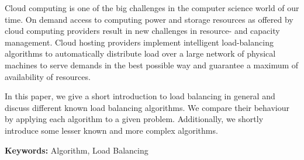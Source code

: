 Cloud computing is one of the big challenges in the computer science world of
our time.
On demand access to computing power and storage resources
as offered by cloud computing providers result in new challenges in resource-
and capacity management.
Cloud hosting providers implement intelligent load-balancing algorithms to
automatically
distribute load over a large network of physical machines to serve demands in
the best possible way and guarantee a maximum of availability of resources.

In this paper, we give a short introduction to load balancing in general and
discuss different known load balancing algorithms.
We compare their behaviour by applying each algorithm to a given problem.
Additionally, we shortly introduce some lesser known and more complex
algorithms.

\textbf{Keywords:} Algorithm, Load Balancing
